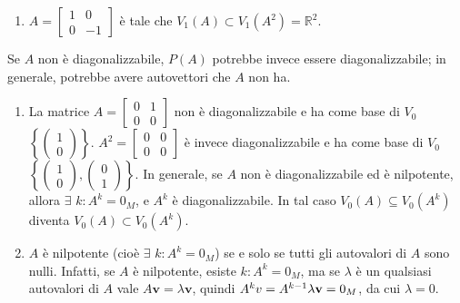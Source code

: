 \documentclass{article}
\begin{document}
\begin{enumerate}
\item $A=\left[ 
\begin{array}{cc}
1 & 0 \\ 
0 & -1%
\end{array}%
\right] $ \`{e} tale che $V_{1}\left( A\right) \subset V_{1}\left(
A^{2}\right) =%
\mathbb{R}
^{2}$.
\end{enumerate}

Se $A$ non \`{e} diagonalizzabile, $P\left( A\right) $ potrebbe invece
essere diagonalizzabile; in generale, potrebbe avere autovettori che $A$ non
ha.

\begin{enumerate}
\item La matrice $A=\left[ 
\begin{array}{cc}
0 & 1 \\ 
0 & 0%
\end{array}%
\right] $ non \`{e} diagonalizzabile e ha come base di $V_{0}$ $\left\{
\left( 
\begin{array}{c}
1 \\ 
0%
\end{array}%
\right) \right\} $. $A^{2}=\left[ 
\begin{array}{cc}
0 & 0 \\ 
0 & 0%
\end{array}%
\right] $ \`{e} invece diagonalizzabile e ha come base di $V_{0}$ $\left\{
\left( 
\begin{array}{c}
1 \\ 
0%
\end{array}%
\right) ,\left( 
\begin{array}{c}
0 \\ 
1%
\end{array}%
\right) \right\} $. In generale, se $A$ non \`{e} diagonalizzabile ed \`{e}
nilpotente, allora $\exists $ $k:A^{k}=0_{M}$, e $A^{k}$ \`{e}
diagonalizzabile. In tal caso $V_{0}\left( A\right) \subseteq V_{0}\left(
A^{k}\right) $ diventa $V_{0}\left( A\right) \subset V_{0}\left(
A^{k}\right) $.

\item $A$ \`{e} nilpotente (cio\`{e} $\exists $ $k:A^{k}=0_{M}$) se e solo
se tutti gli autovalori di $A$ sono nulli. Infatti, se $A$ \`{e} nilpotente,
esiste $k:A^{k}=0_{M}$, ma se $\lambda $ \`{e} un qualsiasi autovalori di $A$
vale $A\mathbf{v}=\lambda \mathbf{v}$, quindi $A^{k}v=A^{k-1}\lambda \mathbf{%
v}=0_{M}$, da cui $\lambda =0$.
\end{enumerate}
\end{document}
